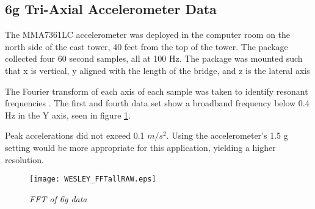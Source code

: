 \subsection{6g Tri-Axial Accelerometer Data}

The MMA7361LC accelerometer was deployed in the computer room on the north side of the east tower, 40 feet from the top of the tower. The package collected four 60 second samples, all at 100 Hz. The package was mounted such that x is vertical, y aligned with the length of the bridge, and z is the lateral axis

\indent The Fourier transform of each axis of each sample was taken to identify resonant frequencies . The first and fourth data set show a broadband frequency below 0.4 Hz in the Y axis, seen in figure \ref{fig:fftall}.

\indent Peak accelerations did not exceed 0.1 $m/s^2$. Using the accelerometer’s 1.5 g setting would be more appropriate for this application, yielding a higher resolution. 

\begin{figure}
\centering
\texttt{[image: WESLEY\_FFTallRAW.eps]}
\caption{\textit{FFT of 6g data}}
\label{fig:fftall}
\end{figure}
